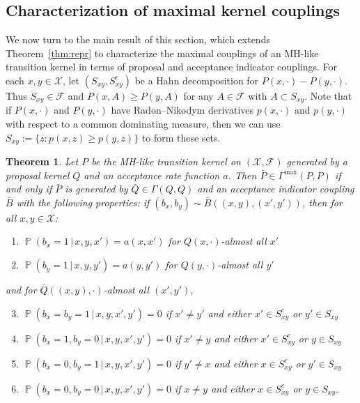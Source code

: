 \documentclass[aihp]{imsart}
\theoremstyle{plain}
\newtheorem{theorem}{Theorem}[section]
\theoremstyle{remark}
\theoremstyle{definition} \newtheorem{example}{Example}
\renewcommand{\P}{\operatorname{\mathbb{P}}}
\newcommand{\scrF}{\mathscr{F}}
\newcommand{\calX}{\mathcal{X}}
\newcommand{\cd}{\cdot}
\newcommand{\g}{\, | \,}
\newcommand{\bp}{\bar P}
\newcommand{\bq}{\bar Q}
\newcommand{\bb}{\bar B}
\newcommand{\xy}{(x,y)}
\newcommand{\xyp}{(x',y')}
\newcommand{\bxy}{(b_x,b_y)}
\newcommand{\Gmax}{\Gamma^\mathrm{max}}
\newcommand{\sxy}{S_{xy}}
\begin{document}
\subsection{Characterization of maximal kernel couplings}
\label{sec:maxc}

We now turn to the main result of this section, which extends Theorem~\ref{thm:repr} to characterize
the maximal couplings of an MH-like transition kernel in terms of proposal and acceptance indicator
couplings. For each $x,y \in \calX$, let $(\sxy, \sxy^c)$ be a Hahn decomposition for $P(x,\cd) -
P(y, \cd)$. Thus $\sxy \in \scrF$ and $P(x,A) \geq P(y,A)$ for any $A \in \scrF$ with $A \subset
\sxy$. Note that if $P(x,\cd)$ and $P(y,\cd)$ have Radon--Nikodym derivatives $p(x,\cd)$ and
$p(y,\cd)$ with respect to a common dominating measure, then we can use $S_{xy} := \{z : p(x, z)
\geq p(y,z) \}$ to form these sets.

\smallskip

\begin{theorem}
\label{thm:max}
Let $P$ be the MH-like transition kernel on $(\calX, \scrF)$ generated by a proposal kernel $Q$ and
an acceptance rate function $a$. Then $\bp \in \Gmax(P,P)$ if and only if $\bp$ is generated by
$\bq \in \Gamma(Q,Q)$ and an acceptance indicator coupling $\bb$ with the following properties: if
$\bxy \sim \bb(\xy,\xyp)$, then for all $x, y \in \calX$:
\begin{enumerate}
	\item $\P(b_x=1 \g x,y,x') = a(x,x')$ for $Q(x,\cdot)$-almost all $x'$
	\item $\P(b_y=1 \g x,y,y')= a(y,y')$ for $Q(y,\cdot)$-almost all $y'$
\end{enumerate}
and for $\bq(\xy,\cd)$-almost all $\xyp$,
\begin{enumerate}
	\setcounter{enumi}{2}
	\item $\P(b_x=b_y=1\g x,y,x',y') = 0$ if $x' \neq y'$ and either $x' \in \sxy^c$ or $y' \in \sxy$
	\item $\P(b_x=1, b_y=0\g x,y,x',y') = 0$ if $x' \neq y$ and either $x' \in \sxy^c$ or $y \in \sxy$
	\item $\P(b_x=0, b_y=1 \g x,y,x',y') = 0$ if $y' \neq x$ and either $x \in \sxy^c$ or $y' \in \sxy$
	\item $\P(b_x=0, b_y=0 \g x,y,x',y') = 0$ if $x \neq y$ and either $x \in \sxy^c$ or $y \in \sxy$.
\end{enumerate}
\end{theorem}
\end{document}
